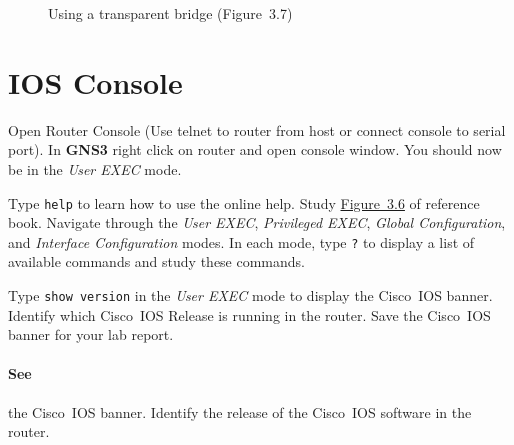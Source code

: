 \documentclass{../UTNetLab}
\begin{document}
    \begin{figure}[H]
        \centering
        \caption{Using a transparent bridge (Figure~3.7)}\label{fig:3.7}
    \end{figure}


\section{IOS Console}
    Open Router Console (Use telnet to router from host or connect console to serial port). In \textbf{GNS3} right click on router and open console window.
    You should now be in the \textit{User EXEC} mode.

    Type \lstinline[language={cisco}]{help} to learn how to use the online help.
    Study \hyperref[fig:3.6]{Figure~3.6} of reference book. Navigate through the \textit{User EXEC}, \textit{Privileged EXEC}, \textit{Global Configuration}, and \textit{Interface Configuration} modes. In each mode, type \lstinline[language={cisco}]{?} to display a list of available commands and study these commands.

    Type \lstinline[language={cisco}]{show version} in the \textit{User EXEC} mode to display the Cisco~IOS banner.
    Identify which Cisco~IOS Release is running in the router.
    Save the Cisco~IOS banner for your lab report.
    
    \paragraph{See} the Cisco~IOS banner.
    Identify the release of the Cisco~IOS software in the router.
\end{document}
